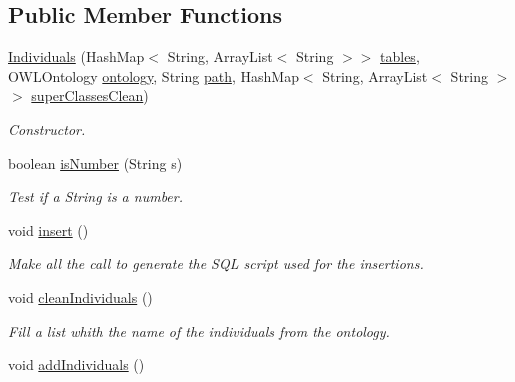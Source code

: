 \subsection*{Public Member Functions}
\begin{DoxyCompactItemize}
\item 
\hyperlink{class_data_base_1_1_individuals_a5ffc589f1ba2d54144a67e9cfcedde22}{Individuals} (HashMap$<$ String, ArrayList$<$ String $>$$>$ \hyperlink{class_data_base_1_1_individuals_ae6a515b85461d50ad21ac1051c5133b1}{tables}, OWLOntology \hyperlink{class_data_base_1_1_individuals_a9c58b63ea5106f271a3b522c6fdc30d7}{ontology}, String \hyperlink{class_data_base_1_1_individuals_a9d3ee042e0b9f2f2889ed6258a9b4e62}{path}, HashMap$<$ String, ArrayList$<$ String $>$$>$ \hyperlink{class_data_base_1_1_individuals_ab96b206dfc1f13a8b96512de40215643}{superClassesClean})
\begin{DoxyCompactList}\small\item\em Constructor. \end{DoxyCompactList}\item 
boolean \hyperlink{class_data_base_1_1_individuals_a283c1394e44fac1eac535caf70c91ae8}{isNumber} (String s)
\begin{DoxyCompactList}\small\item\em Test if a String is a number. \end{DoxyCompactList}\item 
\hypertarget{class_data_base_1_1_individuals_a193e0796d43c441f2496923e0d30effe}{
void \hyperlink{class_data_base_1_1_individuals_a193e0796d43c441f2496923e0d30effe}{insert} ()}
\label{class_data_base_1_1_individuals_a193e0796d43c441f2496923e0d30effe}

\begin{DoxyCompactList}\small\item\em Make all the call to generate the SQL script used for the insertions. \end{DoxyCompactList}\item 
void \hyperlink{class_data_base_1_1_individuals_acd4c28d7442e453d614890c8c31b23da}{cleanIndividuals} ()
\begin{DoxyCompactList}\small\item\em Fill a list whith the name of the individuals from the ontology. \end{DoxyCompactList}\item 
\hypertarget{class_data_base_1_1_individuals_a134db05d0e63a4f2d74e14664065602b}{
void \hyperlink{class_data_base_1_1_individuals_a134db05d0e63a4f2d74e14664065602b}{addIndividuals} ()}
\label{class_data_base_1_1_individuals_a134db05d0e63a4f2d74e14664065602b}


\end{DoxyCompactItemize}
